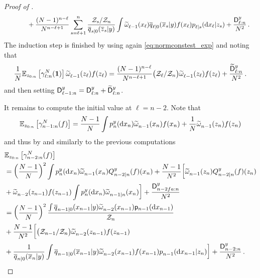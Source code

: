 \begin{proof}[Proof of ]
\begin{equation}
\begin{aligned}
        &  \hspace{1.2cm}  + \frac{(N-1)^{n-\ell}}{N^{n-\ell+1}} \sum_{s=\ell+1} ^n \frac{\normconst_s / \normconst_n}{\tfwtrans{s|0}{\lmeas}{\overline{z}_s}} \int \uweight{}{\ell-1}(x_\ell)  \tfwtrans{\ell|0}{\lmeas}{\ltopstate_s} f(x_\ell) \bwtrans{}{\ell|s}{z_s}{\rmd x_\ell} + \frac{\mathsf{D}^\lmeas _{\ell:n}}{N^2} \eqsp.
        \end{aligned}
    \end{equation}
    The induction step is finished by using again \eqref{eq:normconstest_exp} and noting that 
    \begin{align*} 
        \frac{1}{N} \mathbb{E}_{z_{0:n}} \left[ \gamma^N _{\ell:n}(\mathbf{1}) \right] \widetilde{\omega}^{} _{\ell-1}( z_{\ell}) f(z_{\ell}) = \frac{(N-1)^{n-\ell}}{N^{n - \ell +1}} \big(\mathcal{Z}_\ell / \mathcal{Z}_n\big) \widetilde{\omega}^{} _{\ell-1}( z_{\ell}) f(z_{\ell}) + \frac{\widetilde{\mathsf{D}}^y _{\ell:n}}{N^2} \,.
    \end{align*}
    and then setting $\mathsf{D}^y _{\ell-1:n} = \mathsf{D}^y _{\ell:n} + \widetilde{\mathsf{D}}^y _{\ell:n}$.
    
    It remains to compute the initial value at $\ell = n-2$. Note that
    \begin{equation} 
        \pE_{z_{0:n}} \left[ \normconstest{n-1:n}(f) \right] = \frac{N-1}{N} \int \bwopt{n}{y}{}{}(\rmd x_n) \uweight{}{n-1}(x_n) f(x_n) + \frac{1}{N} \uweight{}{n-1}(z_n) f(z_n) 
    \end{equation}
    and thus by  and similarly to the previous computations
    \begin{align*} 
        & \pE_{z_{0:n}} \left[ \normconstest{n-2:n}(f) \right] \\
        &  = \left( \frac{N-1}{N} \right)^2 \int \bwopt{n}{y}{}{}(\rmd x_n) \uweight{}{n-1}(x_n) \Qker{n-2|n}{y}(f)(x_n) + \frac{N-1}{N^2} \bigg[ \uweight{}{n-1}(z_n)\Qker{n-2|n}{y}(f)(z_n) \\
        & +  \uweight{}{n-2}(z_{n-1}) f(z_{n-1}) \int \bwopt{n}{y}{}{}(\rmd x_n) \uweight{}{n-1|n}(x_n) \bigg] + \frac{\mathsf{D}^\lmeas _{n-2fa:n}}{N^2} \\
        & = \left( \frac{N-1}{N} \right)^2  \frac{\int \tfwtrans{n-1|0}{\lmeas}{\lstate_{n-1}}  \uweight{}{n-2}(\lstate_{n-1}) \bwmarg{n-1}{\rmd \lstate_{n-1}}}{\normconst_n} \\
        & + \frac{N-1}{N^2} \bigg[ \big( \normconst_{n-1} / \normconst_n \big)\uweight{}{n-2}(z_{n-1}) f(z_{n-1}) \\
        & + \frac{1}{\tfwtrans{n|0}{\lmeas}{\ltopstate_n}} \int \tfwtrans{n-1|0}{\lmeas}{\ltopstate_{n-1}} \uweight{}{n-2}(\lstate_{n-1}) f(\lstate_{n-1}) \bwtrans{}{n-1}{z_n}{\rmd \lstate_{n-1}}\bigg] + \frac{\mathsf{D}^\lmeas _{n-2:n}}{N^2} \eqsp.
    \end{align*}
\end{proof}
